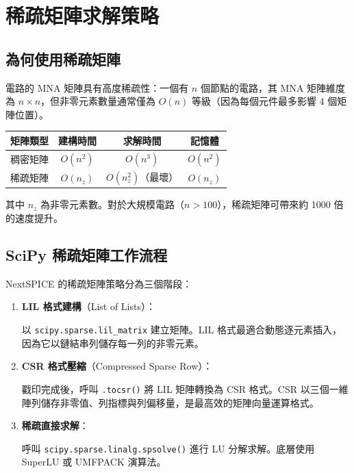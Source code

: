 \documentclass[12pt,a4paper]{article}
\begin{document}
\section{稀疏矩陣求解策略}

\subsection{為何使用稀疏矩陣}

電路的 MNA 矩陣具有高度稀疏性：一個有 $n$ 個節點的電路，其 MNA 矩陣維度為 $n \times n$，但非零元素數量通常僅為 $O(n)$ 等級（因為每個元件最多影響 4 個矩陣位置）。

\begin{center}
\begin{tabular}{lccc}
\toprule
\textbf{矩陣類型} & \textbf{建構時間} & \textbf{求解時間} & \textbf{記憶體} \\
\midrule
稠密矩陣 & $O(n^2)$ & $O(n^3)$ & $O(n^2)$ \\
稀疏矩陣 & $O(n_z)$ & $O(n_z^2)$（最壞） & $O(n_z)$ \\
\bottomrule
\end{tabular}
\end{center}

\noindent 其中 $n_z$ 為非零元素數。對於大規模電路（$n > 100$），稀疏矩陣可帶來約 1000 倍的速度提升。

\subsection{SciPy 稀疏矩陣工作流程}

NextSPICE 的稀疏矩陣策略分為三個階段：

\begin{enumerate}
  \item \textbf{LIL 格式建構}（List of Lists）：

  以 \texttt{scipy.sparse.lil\_matrix} 建立矩陣。LIL 格式最適合動態逐元素插入，因為它以鏈結串列儲存每一列的非零元素。

  \item \textbf{CSR 格式壓縮}（Compressed Sparse Row）：

  戳印完成後，呼叫 \texttt{.tocsr()} 將 LIL 矩陣轉換為 CSR 格式。CSR 以三個一維陣列儲存非零值、列指標與列偏移量，是最高效的矩陣向量運算格式。

  \item \textbf{稀疏直接求解}：

  呼叫 \texttt{scipy.sparse.linalg.spsolve()} 進行 LU 分解求解。底層使用 SuperLU 或 UMFPACK 演算法。
\end{enumerate}
\end{document}
